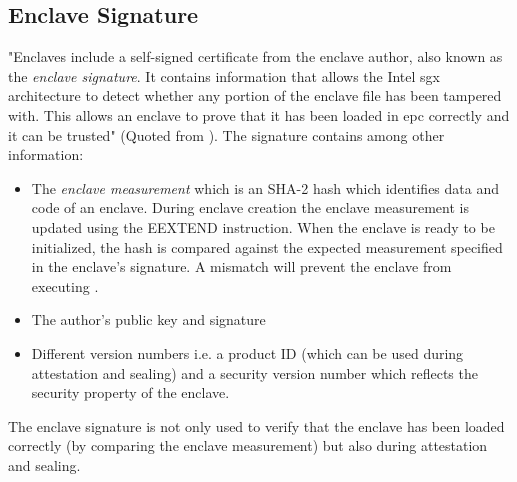 \subsection{Enclave Signature}
\label{sec:EnclaveSignature}
"Enclaves include a self-signed certificate from the enclave author, also known as the \textit{enclave signature}. It contains information that allows the Intel \ac{sgx} architecture 
to detect whether any portion of the enclave file has been tampered with. This allows an enclave to prove that it has been loaded in \ac{epc} correctly and it can be trusted" (Quoted
from \cite{IntelEnclaveSignature}). The signature contains among other information:
\begin{itemize}
    \item The \textit{enclave measurement} which is an SHA-2 hash \cite{Costan2016IntelSE} which identifies data and code of an enclave. During enclave creation the enclave
          measurement is updated using the EEXTEND instruction. When the enclave is ready to be initialized, the hash is compared against the expected measurement specified
          in the enclave's signature. A mismatch will prevent the enclave from executing \cite{IntelEnclaveSignature}.
    \item The author's public key and signature
    \item Different version numbers i.e. a product ID (which can be used during attestation and sealing) and a security version number which reflects the security property of the
          enclave.
\end{itemize}
The enclave signature is not only used to verify that the enclave has been loaded correctly (by comparing the enclave measurement) but also during attestation and sealing.
